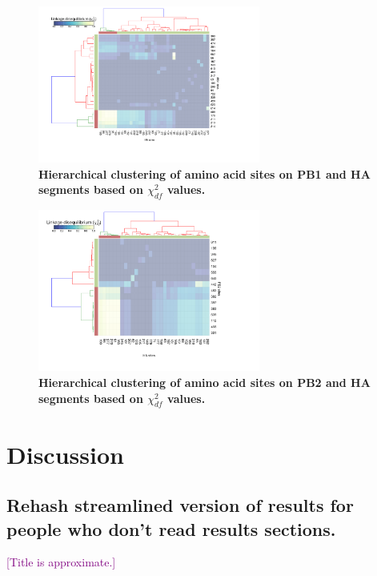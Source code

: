 \documentclass[11pt,oneside,letterpaper]{article}
\def\tbc#1{\textcolor{purple}{[#1]}}
\begin{document}
\begin{figure}[h]
	\centering	
	\includegraphics[width=0.65\textwidth]	{figures/Chi_PB1_HA.png}
	\caption{\textbf{Hierarchical clustering of amino acid sites on PB1 and HA segments based on $\chi^{2}_{df}$ values.}}
	\label{ChiPB1HA}
\end{figure}

\begin{figure}[h]
	\centering	
	\includegraphics[width=0.65\textwidth]	{figures/Chi_PB2_HA.png}
	\caption{\textbf{Hierarchical clustering of amino acid sites on PB2 and HA segments based on $\chi^{2}_{df}$ values.}}
	\label{ChiPB2HA}
\end{figure}


\section*{Discussion}

\subsection*{Rehash streamlined version of results for people who don't read results sections.}

\tbc{Title is approximate.}
\end{document}
